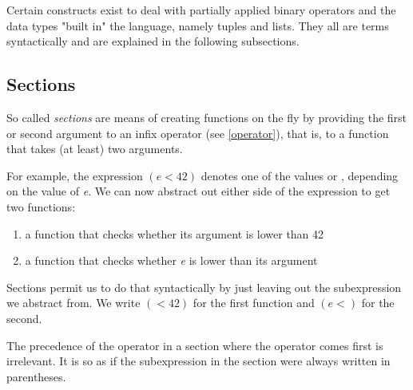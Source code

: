 Certain constructs exist to deal with partially applied binary operators and the data types "built in" the language, namely tuples and lists. They all are terms syntactically and are explained in the following subsections.

\subsection{Sections} 

\begin{flushleft}
 \sym{(}   \sym{)}
 \alt{} \sym{(}   \sym{)}
\end{flushleft}

So called \emph{sections} are means of creating functions on the fly by providing the first or second argument to an infix operator (see \autoref{operator}), that is, to a function that takes (at least) two arguments.

For example, the expression $(e < 42)$ denotes one of the values  or , depending on the value of \emph{e}.
We can now abstract out either side of the expression to get two functions:
\begin{enumerate}
\item a function that checks whether its argument is lower than 42
\item a function that checks whether \emph{e} is lower than its argument
\end{enumerate}
Sections permit us to do that syntactically by just leaving out the subexpression we abstract from. We write $( < 42)$ for the first function and $(e <)$ for the second.


The precedence of the operator in a section where the operator comes first is irrelevant. It is so as if the subexpression in the section were always written in parentheses.

